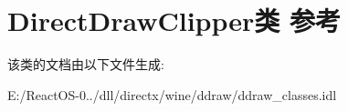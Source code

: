 \hypertarget{class_direct_draw_clipper}{}\section{Direct\+Draw\+Clipper类 参考}
\label{class_direct_draw_clipper}


该类的文档由以下文件生成\+:\begin{DoxyCompactItemize}
\item 
E\+:/\+React\+O\+S-\/0../dll/directx/wine/ddraw/ddraw\+\_\+classes.\+idl\end{DoxyCompactItemize}
